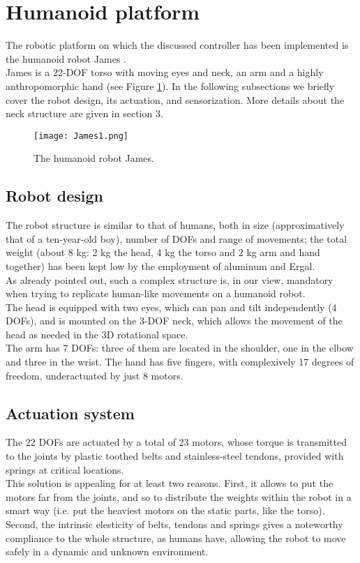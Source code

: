 \documentclass[9pt]{amsart}
\theoremstyle{definition}
\theoremstyle{remark}
\numberwithin{equation}{section}
\begin{document}
\section{Humanoid platform} \label{Sec:Platform}

The robotic platform on which the discussed controller has been implemented is the humanoid robot James \cite{James06}.\\James is a 22-DOF torso with moving eyes and neck, an arm and a highly anthropomorphic hand (see Figure \ref{Fig:PicureJames}). In the following subsections we briefly cover the robot design, its actuation, and sensorization. More details about the neck structure are given in section 3.

\begin{figure}[h!tbp]
\centering
\texttt{[image: James1.png]}
\caption{The humanoid robot James.}
\label{Fig:PicureJames}
\end{figure}

\subsection{Robot design}

The robot structure is similar to that of humans, both in size (approximatively that of a ten-year-old boy), number of DOFs and range of movements; the total weight (about 8 kg: 2 kg the head, 4 kg the torso and 2 kg arm and hand together) has been kept low by the employment of aluminum and Ergal.\\As already pointed out, such a complex structure is, in our view, mandatory when trying to replicate human-like movements on a humanoid robot.\\The head is equipped with two eyes, which can pan and tilt independently (4 DOFs), and is mounted on the 3-DOF neck, which allows the movement of the head as needed in the 3D rotational space.\\The arm has 7 DOFs: three of them are located in the shoulder, one in the elbow and three in the wrist. The hand has five fingers, with complexively 17 degrees of freedom, underactuated by just 8 motors.


\subsection{Actuation system}

The 22 DOFs are actuated by a total of 23 motors, whose torque is transmitted to the joints by plastic toothed belts and stainless-steel tendons, provided with springs at critical locations.\\This solution is appealing for at least two reasons. First, it allows to put the motors far from the joints, and so to distribute the weights within the robot in a smart way (i.e. put the heaviest motors on the static parts, like the torso). Second, the intrinsic elesticity of belts, tendons and springs gives a noteworthy compliance to the whole structure, as humans have, allowing the robot to move safely in a dynamic and unknown environment.
\end{document}
